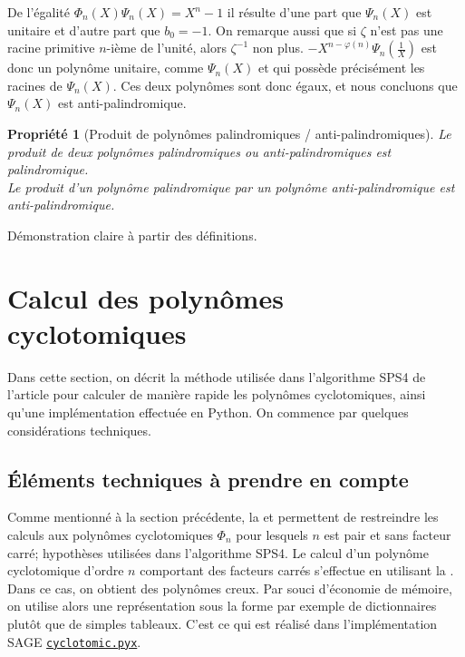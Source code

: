 \documentclass{article}
\theoremstyle{break}                  %
\newtheorem{propriete}{Propriété}
\begin{document}
De l'égalité $\Phi_n(X)\Psi_n(X) = X^n-1$ il résulte d'une part que $\Psi_n(X)$ est unitaire et d'autre part que $b_0=-1$. On remarque aussi que si $\zeta$ n'est pas une racine primitive $n$-ième de l'unité, alors $\zeta^{-1}$ non plus. $-X^{n-\varphi(n)} \Psi_n(\frac{1}{X})$ est donc un polynôme unitaire, comme $\Psi_{n}(X)$ et qui possède précisément les racines de $\Psi_{n}(X)$. Ces deux polynômes sont donc égaux, et nous concluons que $\Psi_{n}(X)$ est anti-palindromique.


\begin{propriete}[Produit de polynômes palindromiques / anti-palindromiques]
	Le produit de deux polynômes palindromiques ou anti-palindromiques est palindromique.\\
	Le produit d'un polynôme palindromique par un polynôme anti-palindromique est anti-palindromique.
\end{propriete}
Démonstration claire à partir des définitions. 

\section*{Calcul des polynômes cyclotomiques}
Dans cette section, on décrit la méthode utilisée dans l'algorithme SPS4 de l'article pour calculer de manière rapide les polynômes cyclotomiques, ainsi qu'une implémentation effectuée en Python. On commence par quelques considérations techniques.

\subsection*{Éléments techniques à prendre en compte}

Comme mentionné à la section précédente, la  et  permettent de restreindre les calculs aux polynômes cyclotomiques $\Phi_n$ pour lesquels $n$ est pair et sans facteur carré; hypothèses utilisées dans l'algorithme SPS4. Le calcul d'un polynôme cyclotomique d'ordre $n$ comportant des facteurs carrés s'effectue en utilisant la . Dans ce cas, on obtient des polynômes creux. Par souci d'économie de mémoire, on utilise alors une représentation sous la forme par exemple de dictionnaires plutôt que de simples tableaux. C'est ce qui est réalisé dans l'implémentation  
SAGE \href{https://github.com/sagemath/sage/blob/develop/src/sage/rings/polynomial/cyclotomic.pyx}{\texttt{cyclotomic.pyx}}.\\
\end{document}
